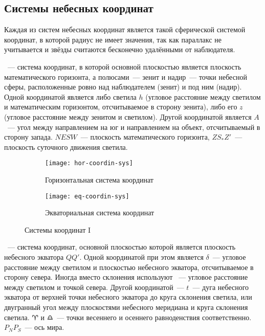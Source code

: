 \subsection{Системы небесных координат}
Каждая из систем небесных координат является такой сферической системой координат, в которой радиус не имеет значения, так как параллакс не учитывается и звёзды считаются бесконечно удалёнными от наблюдателя.

~--- система координат, в которой основной плоскостью является плоскость математического горизонта, а полюсами~--- зенит и надир~--- точки небесной сферы, расположенные ровно над наблюдателем (зенит) и под ним (надир). Одной координатой является либо  светила $h$ (угловое расстояние между светилом и математическим горизонтом, отсчитываемое в сторону зенита), либо его  $z$ (угловое расстояние между зенитом и светилом). Другой координатой является  $A$~--- угол между направлением на юг и направлением на объект, отсчитываемый в сторону запада. $NESW$~--- плоскость математического горизонта, $ZS_*Z'$~--- плоскость суточного движения светила.


\begin{figure}[!h]
\centering
	\begin{subfigure}{0.49\textwidth}
		\texttt{[image: hor-coordin-sys]}
		\caption{Горизонтальная система координат}
	 \end{subfigure}
	 \hfill
	\begin{subfigure}{0.49\textwidth}
		\texttt{[image: eq-coordin-sys]}
		\caption{Экваториальная система координат}
	 \end{subfigure}
	\caption{Системы координат I}
\end{figure}

~--- система координат, основной плоскостью которой является плоскость небесного экватора $QQ'$. Одной координатой при этом является  $\delta$~--- угловое расстояние между светилом и плоскостью небесного экватора, отсчитываемое в сторону севера. Иногда вместо склонения используют ~--- угловое расстояние между светилом и точкой севера. Другой координатой~---  $t$~--- дуга небесного экватора от верхней точки небесного экватора до круга склонения светила, или двугранный угол между плоскостями небесного меридиана и круга склонения светила. $\aries$ и $\libra$~--- точки весеннего и осеннего равноденствия соответственно. $P_NP_S$~--- ось мира.

